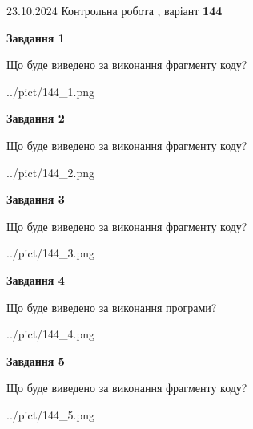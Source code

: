 \documentclass[12pt, ukrainian]{article}
\begin{document}
{\Large{23.10.2024 Контрольна робота , варіант  \No \textbf { 144 }\par}}
{
\begin {large}
{\begin {center}\textbf{Завдання 1}\end {center}}

Що буде виведено за виконання фрагменту коду?\par
\begin{center}
	{../pict/144_1.png}
\end{center}
\newpage

{\begin {center}\textbf{Завдання 2}\end {center}}

Що буде виведено за виконання фрагменту коду?\par
\begin{center}
	{../pict/144_2.png}
\end{center}
\newpage

{\begin {center}\textbf{Завдання 3}\end {center}}

Що буде виведено за виконання фрагменту коду?\par
\begin{center}
	{../pict/144_3.png}
\end{center}
\newpage

{\begin {center}\textbf{Завдання 4}\end {center}}

Що буде виведено за виконання програми?\par
\begin{center}
	{../pict/144_4.png}
\end{center}
\newpage

{\begin {center}\textbf{Завдання 5}\end {center}}

Що буде виведено за виконання фрагменту коду?\par
\begin{center}
	{../pict/144_5.png}
\end{center}
\newpage


\end{large}}
\end{document}
